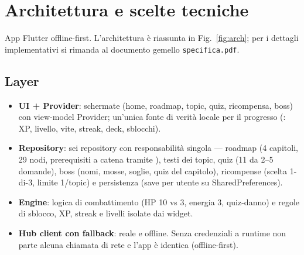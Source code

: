 \chapter{Architettura e scelte tecniche}
\label{g:arch}
App Flutter offline-first. L'architettura \`e riassunta in
Fig.~\ref{fig:arch}; per i dettagli implementativi si rimanda al
documento gemello \texttt{specifica.pdf}.

\section{Layer}
\begin{itemize}
\item \textbf{UI + Provider}: schermate (home, roadmap, topic, quiz,
ricompensa, boss) con view-model Provider; un'unica fonte di verit\`a
locale per il progresso (: XP, livello, vite,
streak, deck, sblocchi).
\item \textbf{Repository}: sei repository con responsabilit\`a singola ---
roadmap (4 capitoli, 29 nodi, prerequisiti a catena tramite
), testi dei topic, quiz (11 da 2--5 domande), boss (nomi, mosse, soglie, quiz del capitolo), ricompense
(scelta 1-di-3, limite 1/topic) e persistenza (save per utente
 su SharedPreferences).
\item \textbf{Engine}: logica di combattimento (HP 10 vs 3, energia 3,
quiz-danno) e regole di sblocco, XP, streak e livelli isolate dai widget.
\item \textbf{Hub client con fallback}:  reale e
 offline. Senza credenziali a runtime non parte
alcuna chiamata di rete e l'app \`e identica (offline-first).
\end{itemize}

